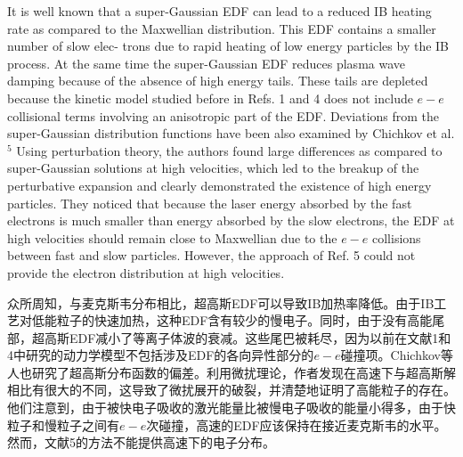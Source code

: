 \documentclass[oneside,onecolumn]{article}
\newcommand\enzhbox[2]{
	\quad\par \begin{paracol}{2} 
			\begin{spacing}{1.0}
					\footnotesize  #1
			\end{spacing}
			
		\switchcolumn[1] 
		#2
	\end{paracol} 
}
\begin{document}
\begin{sloppypar}
\enzhbox{  It is well known that a super-Gaussian EDF can lead to a reduced IB heating rate as compared to the Maxwellian distribution. This EDF contains a smaller number of slow elec- trons due to rapid heating of low energy particles by the IB process. At the same time the super-Gaussian EDF reduces plasma wave damping because of the absence of high energy tails. These tails are depleted because the kinetic model studied before in Refs. 1 and 4 does not include $e-e$ collisional terms involving an anisotropic part of the EDF. Deviations from the super-Gaussian distribution functions have been also examined by Chichkov et al. ${ }^{5}$ Using perturbation theory, the authors found large differences as compared to super-Gaussian solutions at high velocities, which led to the breakup of the perturbative expansion and clearly demonstrated the existence of high energy particles. They noticed that because the laser energy absorbed by the fast electrons is much smaller than energy absorbed by the slow electrons, the EDF at high velocities should remain close to Maxwellian due to the $e-e$ collisions between fast and slow particles. However, the approach of Ref. 5 could not provide the electron distribution at high velocities.
}{
众所周知，与麦克斯韦分布相比，超高斯EDF可以导致IB加热率降低。由于IB工艺对低能粒子的快速加热，这种EDF含有较少的慢电子。同时，由于没有高能尾部，超高斯EDF减小了等离子体波的衰减。这些尾巴被耗尽，因为以前在文献1和4中研究的动力学模型不包括涉及EDF的各向异性部分的$e-e$碰撞项。Chichkov等人也研究了超高斯分布函数的偏差。利用微扰理论，作者发现在高速下与超高斯解相比有很大的不同，这导致了微扰展开的破裂，并清楚地证明了高能粒子的存在。他们注意到，由于被快电子吸收的激光能量比被慢电子吸收的能量小得多，由于快粒子和慢粒子之间有$e-e$次碰撞，高速的EDF应该保持在接近麦克斯韦的水平。然而，文献5的方法不能提供高速下的电子分布。
}
  


\end{sloppypar}
\end{document}
